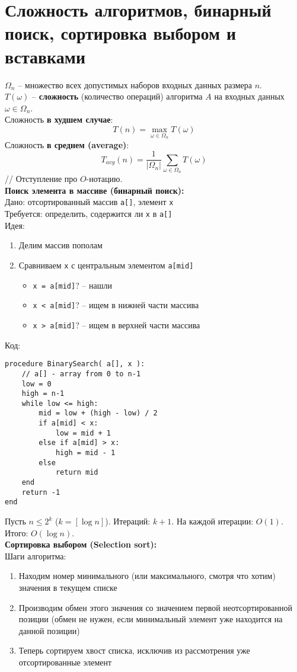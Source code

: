 \documentclass[specialist, subf, href, colorlinks=true, 12pt, times, mtpro, final]{disser}
\def\note{\textcolor{faded}}
\begin{document}
\section {Сложность алгоритмов, бинарный поиск, сортировка выбором и вставками}
 $\Omega_{n}$ – множество всех допустимых наборов входных данных размера $n$.\\
$T(\omega)$ – {\bf сложность} (количество операций) алгоритма $A$ на входных данных $\omega \in \Omega_{n}$.\\
Сложность {\bf в худшем случае}:
$$
  T(n) = \max\limits_{\omega \in \Omega_{n}}T(\omega)
$$
Сложность {\bf в среднем (average)}:
$$
  T_{avg}(n) = \frac{1}{|\Omega_{n}|}\sum\limits_{\omega \in \Omega_{n}}T(\omega)
$$
\note{// Отступление про $O$-нотацию.}\\
{\bf Поиск элемента в массиве (бинарный поиск):}\\
Дано: отсортированный массив \texttt{a[]}, элемент \texttt{x}\\
Требуется: определить, содержится ли \texttt{x} в \texttt{a[]}\\
Идея:
\begin{enumerate}
\item Делим массив пополам
\item Сравниваем \texttt{x} с центральным элементом \texttt{a[mid]}
\begin{itemize}
\item \texttt{x = a[mid]}? – нашли
\item \texttt{x < a[mid]}? – ищем в нижней части массива
\item \texttt{x > a[mid]}? – ищем в верхней части массива
\end{itemize}
\end{enumerate}
Код:\\
\begin{verbatim}
procedure BinarySearch( a[], x ):
    // a[] - array from 0 to n-1
    low = 0
    high = n-1
    while low <= high:
        mid = low + (high - low) / 2
        if a[mid] < x:
            low = mid + 1
        else if a[mid] > x:
            high = mid - 1
        else
            return mid
    end
    return -1
end
\end{verbatim}
Пусть $n \le 2^k$ ($k = [\log n]$). Итераций: $k + 1$. На каждой итерации: $O(1)$. Итого:
$O(\log n)$.\\
{\bf Сортировка выбором (Selection sort):}\\
Шаги алгоритма:
\begin{enumerate}
\item Находим номер минимального (или максимального, смотря что хотим) значения в текущем списке
\item Производим обмен этого значения со значением первой неотсортированной позиции (обмен не нужен, если минимальный элемент уже находится на данной позиции)
\item Теперь сортируем хвост списка, исключив из рассмотрения уже отсортированные элемент
\end{enumerate}
\end{document}
